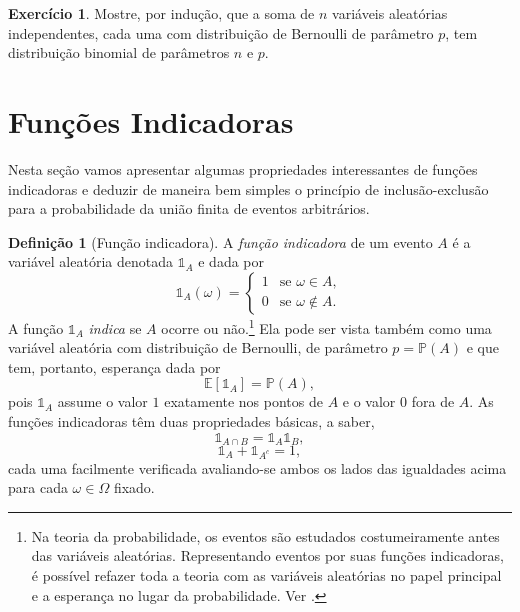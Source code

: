 \documentclass[12pt,portuguese]{article}
\theoremstyle{definition}
\newtheorem{definition}[definition]{Definição}
\newtheorem{exercise}{Exercício}
\begin{document}
\begin{exercise}\label{exercise:soma-bernoulli}
Mostre, por indução, que a soma de $n$ variáveis aleatórias independentes,
cada uma com distribuição de Bernoulli de parâmetro $p$, tem distribuição
binomial de parâmetros $n$ e $p$.
\end{exercise}

\section{Funções Indicadoras}
\label{sec:funcoes-indicadoras}

Nesta seção vamos apresentar algumas propriedades interessantes de
funções indicadoras e deduzir de maneira bem simples o princípio
de inclusão-exclusão para a probabilidade da união finita de eventos arbitrários.
 
\begin{definition}[Função indicadora]\label{def:funcao-indicadora}
A \emph{função indicadora} de um evento $A$ é a variável aleatória
denotada $\mathds{1}_A$ e dada por
\[
\mathds{1}_A(\omega) = \begin{cases} 1 & \text{se } \omega \in A, \\
0 & \text{se } \omega \notin A. \end{cases}
\]
A função $\mathds{1}_A$ \emph{indica} se $A$ ocorre ou
não.\footnote{Na teoria da probabilidade, os eventos são estudados
costumeiramente antes das variáveis aleatórias. Representando eventos por
suas funções indicadoras, é possível refazer toda a teoria com as variáveis
aleatórias no papel principal e a esperança no lugar da probabilidade. Ver
\cite{MR1762736}.} Ela pode ser vista também como uma variável
aleatória com distribuição de Bernoulli, de parâmetro $p=\mathbb{P}(A)$ 
e que tem, portanto, esperança dada por
\[
\mathbb{E}[\mathds{1}_A] = \mathbb{P}(A),
\]
pois $\mathds{1}_A$ assume o valor $1$ exatamente nos pontos de $A$ e o
valor $0$ fora de $A$. As funções indicadoras têm duas propriedades
básicas, a saber,
\begin{equation}\label{eq:indicadora-interseccao}
\mathds{1}_{A \cap B} = \mathds{1}_A \mathds{1}_B,
\end{equation}
\begin{equation}\label{eq:indicadora-complementar}
\mathds{1}_A + \mathds{1}_{A^c} = 1,
\end{equation}
cada uma facilmente verificada avaliando-se ambos os lados
das igualdades acima para cada $\omega \in \Omega$ fixado.
\end{definition}
\end{document}
